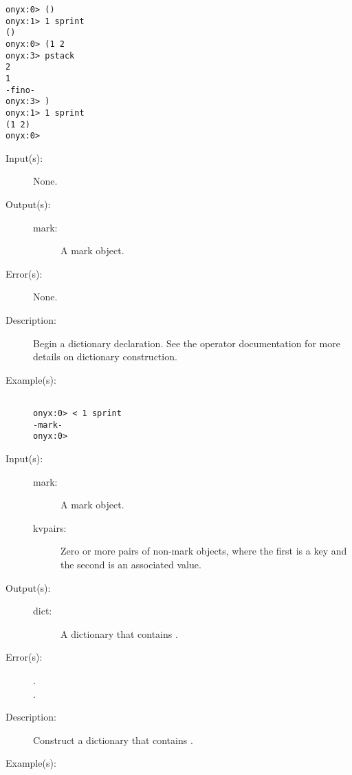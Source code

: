 \begin{description}
\begin{description}
\begin{verbatim}
onyx:0> ()
onyx:1> 1 sprint
()
onyx:0> (1 2
onyx:3> pstack
2
1
-fino-
onyx:3> )
onyx:1> 1 sprint
(1 2)
onyx:0>
		\end{verbatim}
	\end{description}
\label{systemdict:sym_lt}
\item[{\onyxop{--}{{\lt}}{mark}}: ]
	\begin{description}\item[]
	\item[Input(s): ] None.
	\item[Output(s): ]
		\begin{description}\item[]
		\item[mark: ]
			A mark object.
		\end{description}
	\item[Error(s): ] None.
	\item[Description: ]
		Begin a dictionary declaration.  See the
		 operator
		documentation for more details on dictionary construction.
	\item[Example(s): ]\begin{verbatim}

onyx:0> < 1 sprint
-mark-
onyx:0>
		\end{verbatim}
	\end{description}
\label{systemdict:sym_gt}
\item[{\onyxop{mark kvpairs}{{\gt}}{dict}}: ]
	\begin{description}\item[]
	\item[Input(s): ]
		\begin{description}\item[]
		\item[mark: ]
			A mark object.
		\item[kvpairs: ]
			Zero or more pairs of non-mark objects, where the first
			is a key and the second is an associated value.
		\end{description}
	\item[Output(s): ]
		\begin{description}\item[]
		\item[dict: ]
			A dictionary that contains .
		\end{description}
	\item[Error(s): ]
		\begin{description}\item[]
		\item[.]
		\item[.]
		\end{description}
	\item[Description: ]
		Construct a dictionary that contains .
	\item[Example(s): ]\begin{verbatim}


\end{verbatim}
\end{description}
\end{description}
